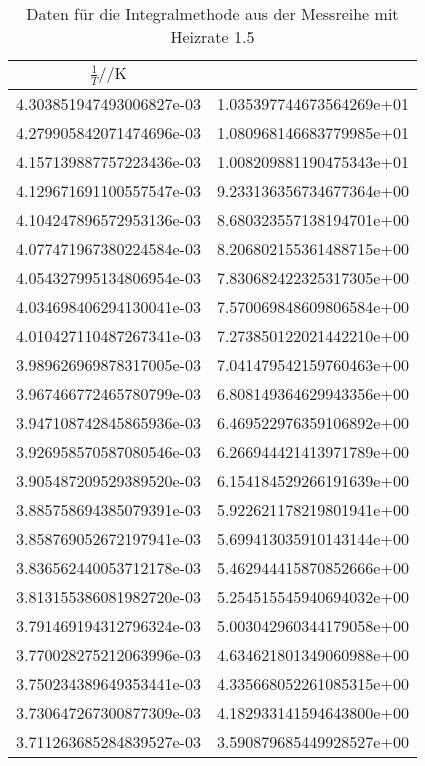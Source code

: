 \begin{table}
 \centering
 \begin{tabular}{S[round-mode = places , round-precision = 4,scientific-notation=fixed, fixed-exponent = 0] S[round-mode = places , round-precision = 0,scientific-notation=fixed, fixed-exponent = 0]}
   \toprule
	$\frac{1}{T} / \si{\per\kelvin}$ &
    \\
   \midrule
	4.303851947493006827e-03 & 1.035397744673564269e+01\\
	4.279905842071474696e-03 & 1.080968146683779985e+01\\
	4.157139887757223436e-03 & 1.008209881190475343e+01\\
	4.129671691100557547e-03 & 9.233136356734677364e+00\\
	4.104247896572953136e-03 & 8.680323557138194701e+00\\
	4.077471967380224584e-03 & 8.206802155361488715e+00\\
	4.054327995134806954e-03 & 7.830682422325317305e+00\\
	4.034698406294130041e-03 & 7.570069848609806584e+00\\
	4.010427110487267341e-03 & 7.273850122021442210e+00\\
	3.989626969878317005e-03 & 7.041479542159760463e+00\\
	3.967466772465780799e-03 & 6.808149364629943356e+00\\
	3.947108742845865936e-03 & 6.469522976359106892e+00\\
	3.926958570587080546e-03 & 6.266944421413971789e+00\\
	3.905487209529389520e-03 & 6.154184529266191639e+00\\
	3.885758694385079391e-03 & 5.922621178219801941e+00\\
	3.858769052672197941e-03 & 5.699413035910143144e+00\\
	3.836562440053712178e-03 & 5.462944415870852666e+00\\
	3.813155386081982720e-03 & 5.254515545940694032e+00\\
	3.791469194312796324e-03 & 5.003042960344179058e+00\\
	3.770028275212063996e-03 & 4.634621801349060988e+00\\
	3.750234389649353441e-03 & 4.335668052261085315e+00\\
	3.730647267300877309e-03 & 4.182933141594643800e+00\\
	3.711263685284839527e-03 & 3.590879685449928527e+00\\
   \bottomrule
 \end{tabular}
 \caption{Daten für die Integralmethode aus der Messreihe mit Heizrate 1.5}
 \label{tab:WM215tab}
\end{table}

